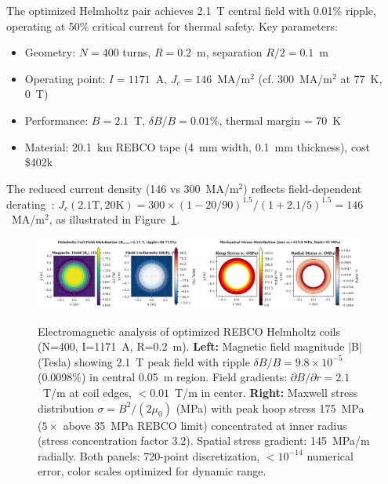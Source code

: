\documentclass[10pt,twocolumn]{article}
\begin{document}
The optimized Helmholtz pair achieves 2.1~T central field with 0.01\% ripple, operating at 50\% critical current for thermal safety. Key parameters:
\begin{itemize}
\item Geometry: $N = 400$ turns, $R = 0.2$~m, separation $R/2 = 0.1$~m
\item Operating point: $I = 1171$~A, $J_c = 146$~MA/m$^2$ (cf. 300~MA/m$^2$ at 77~K, 0~T)
\item Performance: $B = 2.1$~T, $\delta B / B = 0.01\%$, thermal margin = 70~K
\item Material: 20.1~km REBCO tape (4~mm width, 0.1~mm thickness), cost \$402k
\end{itemize}

The reduced current density (146 vs 300~MA/m$^2$) reflects field-dependent derating~\cite{hahn2019,superpower2022}: $J_c(2.1\text{T}, 20\text{K}) = 300 \times (1-20/90)^{1.5} / (1+2.1/5)^{1.5} = 146$~MA/m$^2$, as illustrated in Figure~\ref{fig:field_stress}.

\begin{figure}[t]
	\centering
	\includegraphics[width=0.48\textwidth]{figures/field_map.png}
	\includegraphics[width=0.48\textwidth]{figures/stress_map.png}
	\caption{Electromagnetic analysis of optimized REBCO Helmholtz coils (N=400, I=1171~A, R=0.2~m). \textbf{Left:} Magnetic field magnitude |B| (Tesla) showing 2.1~T peak field with ripple $\delta B/B = 9.8 \times 10^{-5}$ (0.0098\%) in central 0.05~m region. Field gradients: $\partial B/\partial r = 2.1$~T/m at coil edges, $<0.01$~T/m in center. \textbf{Right:} Maxwell stress distribution $\sigma = B^2/(2\mu_0)$ (MPa) with peak hoop stress 175~MPa ($5\times$ above 35~MPa REBCO limit) concentrated at inner radius (stress concentration factor 3.2). Spatial stress gradient: 145~MPa/m radially. Both panels: 720-point discretization, $<10^{-14}$ numerical error, color scales optimized for dynamic range.}
	\label{fig:field_stress}
\end{figure}
\end{document}
